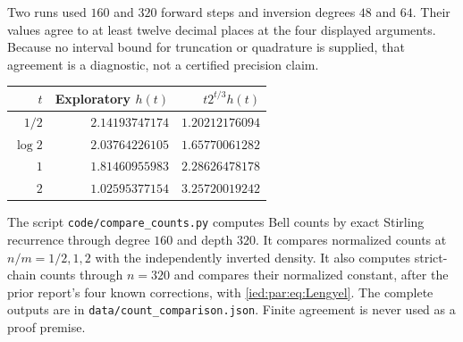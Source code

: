 \documentclass[11pt,letterpaper]{article}
\theoremstyle{remark}\newtheorem{remark}[theorem]{Remark}
\newcommand{\file}[1]{\nolinkurl{#1}}
\begin{document}
Two runs used $160$ and $320$ forward steps and inversion degrees
$48$ and $64$. Their values agree to at least twelve decimal places
at the four displayed arguments. Because no interval bound for
truncation or quadrature is supplied, that agreement is a diagnostic,
not a certified precision claim.
\begin{center}
\begin{tabular}{@{}rrr@{}}
\toprule
$t$ & Exploratory $h(t)$ & $t2^{t/3}h(t)$\\
\midrule
$1/2$ & $2.14193747174$ & $1.20212176094$\\
$\log2$ & $2.03764226105$ & $1.65770061282$\\
$1$ & $1.81460955983$ & $2.28626478178$\\
$2$ & $1.02595377154$ & $3.25720019242$\\
\bottomrule
\end{tabular}
\end{center}

The script \file{code/compare_counts.py} computes Bell counts by exact
Stirling recurrence through degree $160$ and depth $320$.
It compares normalized counts at $n/m=1/2,1,2$ with the independently
inverted density. It also computes strict-chain counts through $n=320$
and compares their normalized constant, after the prior report's four
known corrections, with \eqref{ied:par:eq:Lengyel}.
The complete outputs are in \file{data/count_comparison.json}.
Finite agreement is never used as a proof premise.
\end{document}
